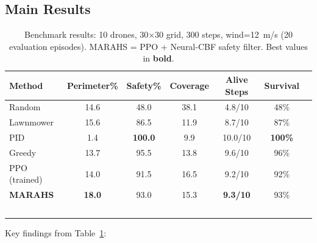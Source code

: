 \documentclass[12pt,a4paper]{article}
\begin{document}
\subsection{Main Results}

\begin{table}[t]
\centering
\caption{Benchmark results: 10 drones, 30$\times$30 grid, 300 steps, wind=12~m/s (20 evaluation episodes). MARAHS = PPO + Neural-CBF safety filter. Best values in \textbf{bold}.}
\label{tab:main_results}
\begin{tabular}{lcccccc}
\toprule
\textbf{Method} & \textbf{Perimeter\%} & \textbf{Safety\%} & \textbf{Coverage} & \textbf{Alive Steps} & \textbf{Survival} \\
\midrule
Random         & 14.6  & 48.0  & 38.1 & 4.8/10  & 48\% \\
Lawnmower      & 15.6  & 86.5  & 11.9 & 8.7/10  & 87\% \\
PID            & 1.4   & \textbf{100.0} & 9.9  & 10.0/10 & \textbf{100\%} \\
Greedy         & 13.7  & 95.5  & 13.8 & 9.6/10  & 96\% \\
PPO (trained)  & 14.0  & 91.5  & 16.5 & 9.2/10  & 92\% \\
\textbf{MARAHS} & \textbf{18.0} & 93.0 & 15.3 & \textbf{9.3/10} & 93\% \\\
\bottomrule
\end{tabular}
\end{table}

Key findings from Table~\ref{tab:main_results}:
\end{document}
